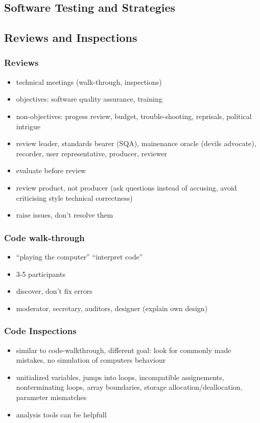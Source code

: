 \documentclass[a4paper, 10pt]{article}
\begin{document}
\subsection{Software Testing and Strategies}
\subsection{Reviews and Inspections}
\subsubsection{Reviews}
\begin{itemize}
	\item technical meetings (walk-through, inspections)
	\item objectives: software quality assurance, training
	\item non-objectives: progess review, budget, trouble-shooting, reprisals, political intrigue
	\item review leader, standards bearer (SQA), mainenance oracle (devils advocate), recorder, user representative, producer, reviewer
	\item evaluate before review
	\item review product, not producer (ask questions instead of accusing, avoid criticising style \follows technical correctness)
	\item raise issues, don't resolve them
\end{itemize}

\subsubsection{Code walk-through}
\begin{itemize}
	\item ``playing the computer'' \follows ``interpret code''
	\item 3-5 participants
	\item discover, don't fix errors
	\item moderator, secretary, auditors, designer (explain own design)
\end{itemize}

\subsubsection{Code Inspections}
\begin{itemize}
	\item similar to code-walkthrough, different goal: look for commonly made mistakes, no simulation of computers behaviour
	\item unitialized variables, jumps into loops, incompatible assignements, nonterminating loops, array boundaries, storage allocation/deallocation, parameter mismatches
	\item analysis tools can be helpfull
\end{itemize}
\end{document}
